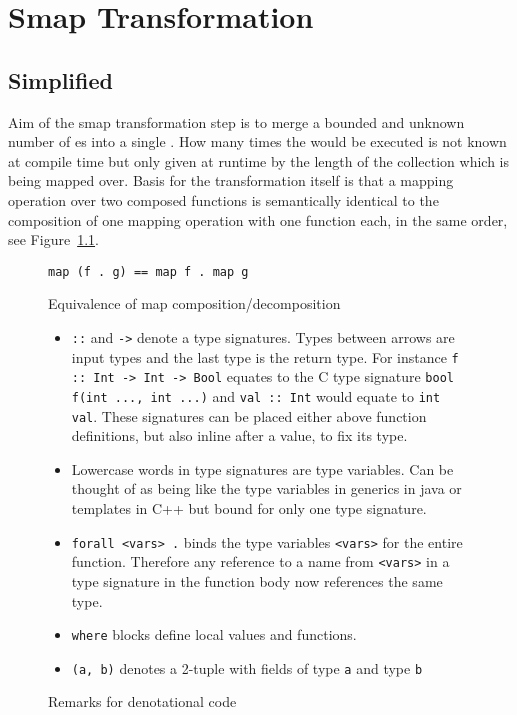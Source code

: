 \chapter{Smap Transformation}

\label{ch:smap-transformation}

\section{Simplified}

Aim of the smap transformation step is to merge a bounded and unknown number of \fetch{}es into a single \fetch{}.
How many times the \fetch{} would be executed is not known at compile time but only given at runtime by the length of the collection which is being mapped over.
Basis for the transformation itself is that a mapping operation over two composed functions is semantically identical to the composition of one mapping operation with one function each, in the same order, see Figure~\ref{fig:map-comp-decomp}.

\begin{figure}
\begin{verbatim}
map (f . g) == map f . map g
\end{verbatim}
    \caption{Equivalence of map composition/decomposition}
    \label{fig:map-comp-decomp}
\end{figure}

\begin{figure}[h]
    \begin{itemize}
        \item \texttt{::} and \texttt{->} denote a type signatures. Types between arrows are input types and the last type is the return type.
        For instance \texttt{f :: Int -> Int -> Bool} equates to the C type signature \texttt{bool f(int ..., int ...)} and \texttt{val :: Int} would equate to \texttt{int val}.
        These signatures can be placed either above function definitions, but also inline after a value, to fix its type.
        \item Lowercase words in type signatures are type variables. Can be thought of as being like the type variables in generics in java or templates in C++ but bound for only one type signature.
        \item \texttt{forall <vars> .} binds the type variables \texttt{<vars>} for the entire function. Therefore any reference to a name from \texttt{<vars>} in a type signature in the function body now references the same type.
        \item \texttt{where} blocks define local values and functions.
        \item \texttt{(a, b)} denotes a 2-tuple with fields of type \texttt{a} and type \texttt{b}
    \end{itemize}
    \caption{Remarks for denotational code}
    \label{fig:remarks-for-denotational}
\end{figure}

